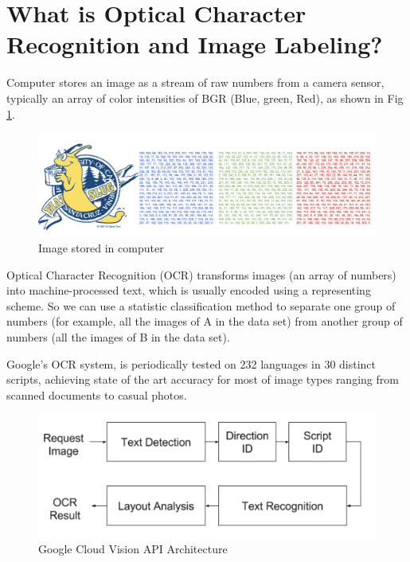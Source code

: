 \documentclass[11pt]{ucscthesis}
\begin{document}
\section{What is Optical Character Recognition and Image Labeling?}
Computer stores an image as a stream of raw numbers from a camera sensor, typically an array of color intensities of BGR (Blue, green, Red), as shown in Fig \ref{Image}. 


\begin{figure}
    \centering
    \includegraphics[width =0.8\linewidth]{Fig/image.png}
    \caption{Image stored in computer}
    \label{Image}
\end{figure}


Optical Character Recognition (OCR) transforms images (an array of numbers) into machine-processed text, which is usually encoded using a representing scheme. So we can use a statistic classification method \cite{kotsiantis2006machine}\cite{kotsiantis2007supervised}\cite{nickel2015review} to separate one group of numbers (for example, all the images of A in the data set) from another group of numbers (all the images of B in the data set).  


Google's\cite{GoogleDocumentTextTutorial} OCR system, is periodically tested on 232 languages in 30 distinct scripts, achieving state of the art accuracy for most of image types ranging from scanned documents to casual photos.

\begin{figure}
    \centering
    \includegraphics[width =0.8\linewidth]{Fig/googleOCRpipeline.png}
    \caption{Google Cloud Vision API Architecture \cite{GoogleDocumentTextTutorial}}
    \label{Google Document Text Tutorial}
\end{figure}
\end{document}
